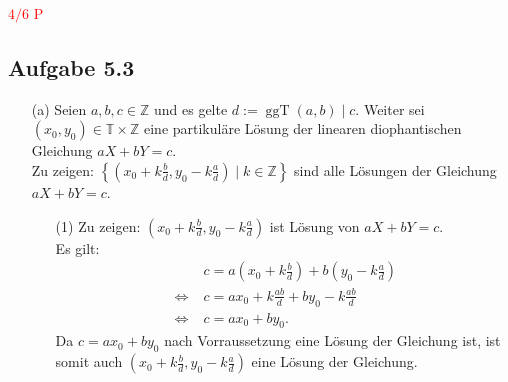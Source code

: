 \documentclass[12pt]{article}
\newcommand{\corr}[1]{\textcolor{red}{#1}}
\newcommand{\gdw}{\;\Longleftrightarrow\;}
\newcommand{\ggT}{\operatorname{ggT}}
\begin{document}
\corr{$4/6$ P}

\subsection*{Aufgabe 5.3}
\begin{enumerate}
	\item[(a)] Seien $a,b,c\in\mathbb{Z}$ und es gelte $d:=\ggT(a,b)\mid c$. Weiter sei$(x_0,y_0)\in\mathbb{T}\times\mathbb{Z}$ eine partikuläre Lösung der linearen diophantischen Gleichung $aX+bY=c$. \\
	Zu zeigen: $\left\{(x_0+k\frac{b}{d},y_0-k\frac{a}{d})\mid k\in\mathbb{Z}\right\}$ sind alle Lösungen der Gleichung $aX+bY=c$. \\
	\begin{enumerate}
		\item[(1)] Zu zeigen: $(x_0+k\frac{b}{d},y_0-k\frac{a}{d})$ ist Lösung von $aX+bY=c$. \\
		Es gilt:
		\begin{align*}
			&c=a\left(x_0+k\frac{b}{d}\right)+b\left(y_0-k\frac{a}{d}\right) \\
			\gdw &c=ax_0+k\frac{ab}{d}+by_0-k\frac{ab}{d} \\
			\gdw &c=ax_0+by_0.
		\end{align*}
		Da $c=ax_0+by_0$ nach Vorraussetzung eine Lösung der Gleichung ist, ist somit auch $(x_0+k\frac{b}{d},y_0-k\frac{a}{d})$ eine Lösung der Gleichung. \\
		

\end{enumerate}
\end{enumerate}
\end{document}
